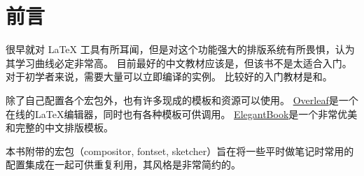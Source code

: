 \chapter{前言}

很早就对 {\LaTeX} 工具有所耳闻，但是对这个功能强大的排版系统有所畏惧，认为其学习曲线必定非常高。
目前最好的中文教材应该是\cite{LIU13}，但该书不是太适合入门。 对于初学者来说，需要大量可以立即编译的实例。 
比较好的入门教材是\cite{SK11}和\cite{SK15}。

除了自己配置各个宏包外，也有许多现成的模板和资源可以使用。
\href{https://www.overleaf.com}{Overleaf}是一个在线的{\LaTeX}编辑器，同时也有各种模板可供调用。
\href{https://github.com/ElegantLaTeX/ElegantBook}{ElegantBook}是一个非常优美和完整的中文排版模板。

本书附带的宏包（compositor, fontset, sketcher）旨在将一些平时做笔记时常用的配置集成在一起可供重复利用，其风格是非常简约的。
